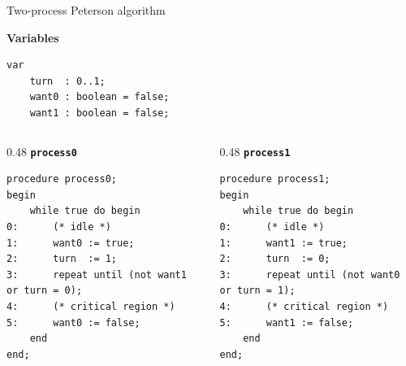 \documentclass[aspectratio=169,10pt]{beamer}
\begin{document}
\begin{frame}[fragile]{Two-process Peterson algorithm}

\textbf{Variables}
\begin{lstlisting}[basicstyle=\ttfamily\scriptsize]
var
    turn  : 0..1;
    want0 : boolean = false;
    want1 : boolean = false;
\end{lstlisting}

\vspace{0.3em}

\begin{columns}[T,onlytextwidth]

\begin{column}{0.48\textwidth}
\textbf{\texttt{process0}}
\begin{lstlisting}[basicstyle=\ttfamily\scriptsize]
procedure process0;
begin
    while true do begin
0:      (* idle *)
1:      want0 := true;
2:      turn  := 1;
3:      repeat until (not want1 or turn = 0);
4:      (* critical region *)
5:      want0 := false;
    end
end;
\end{lstlisting}
\end{column}

\begin{column}{0.48\textwidth}
\textbf{\texttt{process1}}
\begin{lstlisting}[basicstyle=\ttfamily\scriptsize]
procedure process1;
begin
    while true do begin
0:      (* idle *)
1:      want1 := true;
2:      turn  := 0;
3:      repeat until (not want0 or turn = 1);
4:      (* critical region *)
5:      want1 := false;
    end
end;
\end{lstlisting}
\end{column}

\end{columns}

\end{frame}
\end{document}
